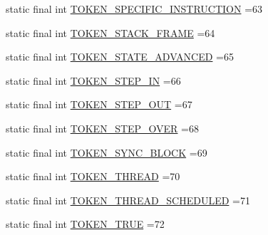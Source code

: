 \begin{DoxyCompactItemize}
\item 
static final int \hyperlink{classgov_1_1nasa_1_1jpf_1_1inspector_1_1server_1_1expression_1_1parser_1_1_expression_grammar_lexer_a2ea7caedaf6e9578ac9002c2505a31a2}{T\+O\+K\+E\+N\+\_\+\+S\+P\+E\+C\+I\+F\+I\+C\+\_\+\+I\+N\+S\+T\+R\+U\+C\+T\+I\+ON} =63
\item 
static final int \hyperlink{classgov_1_1nasa_1_1jpf_1_1inspector_1_1server_1_1expression_1_1parser_1_1_expression_grammar_lexer_a89cd27213ca37573a0d9dde50646a24c}{T\+O\+K\+E\+N\+\_\+\+S\+T\+A\+C\+K\+\_\+\+F\+R\+A\+ME} =64
\item 
static final int \hyperlink{classgov_1_1nasa_1_1jpf_1_1inspector_1_1server_1_1expression_1_1parser_1_1_expression_grammar_lexer_a29860919f354e3a04dd49cfc2d893c48}{T\+O\+K\+E\+N\+\_\+\+S\+T\+A\+T\+E\+\_\+\+A\+D\+V\+A\+N\+C\+ED} =65
\item 
static final int \hyperlink{classgov_1_1nasa_1_1jpf_1_1inspector_1_1server_1_1expression_1_1parser_1_1_expression_grammar_lexer_a08050d0060572bd76b91fd4e9c6853a3}{T\+O\+K\+E\+N\+\_\+\+S\+T\+E\+P\+\_\+\+IN} =66
\item 
static final int \hyperlink{classgov_1_1nasa_1_1jpf_1_1inspector_1_1server_1_1expression_1_1parser_1_1_expression_grammar_lexer_ab3e7fe7b1b11f9682d34ef7c4ac1fbd0}{T\+O\+K\+E\+N\+\_\+\+S\+T\+E\+P\+\_\+\+O\+UT} =67
\item 
static final int \hyperlink{classgov_1_1nasa_1_1jpf_1_1inspector_1_1server_1_1expression_1_1parser_1_1_expression_grammar_lexer_a9dd94468102b0128435ca415c72abcf1}{T\+O\+K\+E\+N\+\_\+\+S\+T\+E\+P\+\_\+\+O\+V\+ER} =68
\item 
static final int \hyperlink{classgov_1_1nasa_1_1jpf_1_1inspector_1_1server_1_1expression_1_1parser_1_1_expression_grammar_lexer_a120d67fe9643226f13225a06e13d0c20}{T\+O\+K\+E\+N\+\_\+\+S\+Y\+N\+C\+\_\+\+B\+L\+O\+CK} =69
\item 
static final int \hyperlink{classgov_1_1nasa_1_1jpf_1_1inspector_1_1server_1_1expression_1_1parser_1_1_expression_grammar_lexer_a59fb1cbc19a573ce6c2041e6495da7f4}{T\+O\+K\+E\+N\+\_\+\+T\+H\+R\+E\+AD} =70
\item 
static final int \hyperlink{classgov_1_1nasa_1_1jpf_1_1inspector_1_1server_1_1expression_1_1parser_1_1_expression_grammar_lexer_a834bb65d4d3bb7eba132f9939e539e6a}{T\+O\+K\+E\+N\+\_\+\+T\+H\+R\+E\+A\+D\+\_\+\+S\+C\+H\+E\+D\+U\+L\+ED} =71
\item 
static final int \hyperlink{classgov_1_1nasa_1_1jpf_1_1inspector_1_1server_1_1expression_1_1parser_1_1_expression_grammar_lexer_ad28a5f2fced4d4a8a775f072853ae674}{T\+O\+K\+E\+N\+\_\+\+T\+R\+UE} =72

\end{DoxyCompactItemize}
